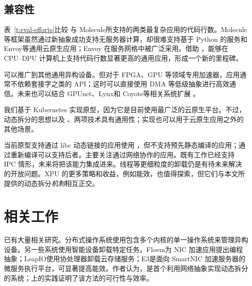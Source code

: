 \subsection{兼容性}

表~\ref{t:eval-efforts}比较 \sys 与 Molecule\cite{10.1145/3503222.3507732}所支持的两类最复杂应用的代码行数。Molecule 等框架虽然通过新抽象成功支持无服务器计算，却很难支持基于 Python 的服务和 Envoy\cite{envoy}等通用云原生应用；Envoy 在服务网格中被广泛采用。\sys 借助 \os，能够在 CPU--DPU 计算机上支持代码行数显著更高的通用应用，形成一个新的里程碑。

\os 可以推广到其他通用异构设备。但对于 FPGA、GPU 等领域专用加速器，应用通常不依赖套接字之类的 API；这时可以直接使用 DMA 等低级抽象进行高效通信。未来也可以结合 GPUnet\cite{kim2014gpunet}、Lynx\cite{tork2020lynx}和 Coyote\cite{korolija2020abstractions}等相关系统扩展 \os。

我们基于 Kubernetes 实现原型，因为它是目前使用最广泛的云原生平台\cite{cncf-landscape}。不过，动态拆分的思想以及 \giptable、\gsocket 两项技术具有通用性；实现也可以用于云原生应用之外的其他场景。

当前原型支持通过 libc 动态链接的应用使用 \gsocket，但不支持预先静态编译的应用；通过重新编译可以支持后者。\os 主要关注通过网络协作的应用。既有工作\cite{10.1145/3503222.3507732}已经支持 IPC 情形，未来将把该能力集成进来。线程等更细粒度的卸载仍是有待未来解决的开放问题。XPU 的更多策略和收益，例如能效\cite{234944}，也值得探索，但它们与本文所提供的动态拆分\emph{机制}相互正交。

\section{相关工作}
\label{s:relwk}

已有大量相关研究\cite{phothilimthana2018floem,seshadri2014willow,gu2016biscuit,baumann2009multikernel,barbalace2015popcorn,gamsa1999tornado,silberstein2013gpufs,kim2014gpunet,silberstein2017omnix,tork2020lynx,brokhman2019gaia,shan2018legoos,Asmussen:2016:MHC:2872362.2872371,nider2021last,pemberton2021restless,10.1145/3458336.3465273,liu2019offloading,cho2020flick}。分布式操作系统\cite{baumann2009multikernel,silberstein2017omnix,barbalace2015popcorn}使用包含多个内核的单一操作系统来管理异构设备。另一些系统使用智能设备卸载特定任务\cite{phothilimthana2018floem,seshadri2014willow,gu2016biscuit,kim2014gpunet,silberstein2013gpufs}。Floem\cite{phothilimthana2018floem}为 NIC 加速应用提出编程抽象；LeapIO\cite{li2020leapio}使用协处理器卸载云存储服务；E3\cite{234944}是面向 SmartNIC 加速服务器的微服务执行平台，可显著提高能效。作者认为，\os 是首个利用网络抽象实现动态拆分的系统；\sys 上的实践证明了该方法的可行性与效率。

